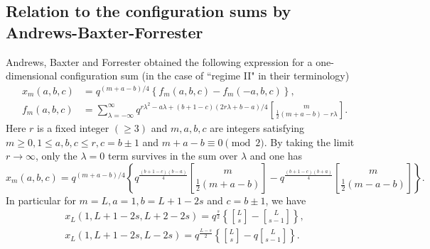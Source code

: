 \documentclass[sn-mathphys-num]{sn-jnl}%
\theoremstyle{thmstyleone}%
\theoremstyle{thmstyletwo}%
\theoremstyle{thmstylethree}%
\begin{document}
\begin{appendices}
\section{Relation to the configuration sums by Andrews-Baxter-Forrester}\label{secC}
Andrews, Baxter and Forrester \cite[Lemma 2.6.1]{ABF}  obtained the following
expression for a one-dimensional configuration sum
(in the case of ``regime II" in their terminology)
\begin{align*}
x_m(a,b,c) &= q^{(m+a-b)/4} \left\{
f_m (a,b,c) - f_m(-a,b,c) \right\}, \\
f_m(a,b,c)&=\sum_{\lambda = - \infty}^\infty 
q^{r \lambda^2 - a \lambda + (b+1-c)(2r\lambda + b-a)/4}
{ m \brack \frac12 (m+a-b) - r \lambda }.
\end{align*}
Here $r$ is a fixed integer $(\geq 3)$ and $m,a,b,c$ are integers satisfying 
$m \geq 0, 1 \leq a,b,c \leq r, c=b\pm 1$ and $m+a-b \equiv 0 \pmod{2}$.
By taking the limit $r \rightarrow \infty$, only the $\lambda =0$ term survives in the sum over $\lambda$
and one has
\begin{equation*}
x_m(a,b,c) = q^{(m+a-b)/4} \left\{
q^{\frac{(b+1-c)(b-a)}{4}} { m \brack \frac12 (m+a-b) } -
q^{\frac{(b+1-c)(b+a)}{4}} { m \brack \frac12 (m-a-b) }\right\}.
\end{equation*}
In particular for $m=L, a=1,b=L+1-2s$ and $c=b\pm1$, we have
\begin{align}
x_L(1,L+1-2s, L+2-2s) =
q^{\frac{s}{2}} \left\{
{ L \brack s } -
 { L \brack s-1 }\right\}, \label{eq:2025jun16_1}\\
x_L(1,L+1-2s, L-2s) =
q^{\frac{L-s}{2}} \left\{
{ L \brack s } -
q { L \brack s-1 }\right\}.\label{eq:2025jun16_2}
\end{align}





\end{appendices}
\end{document}
